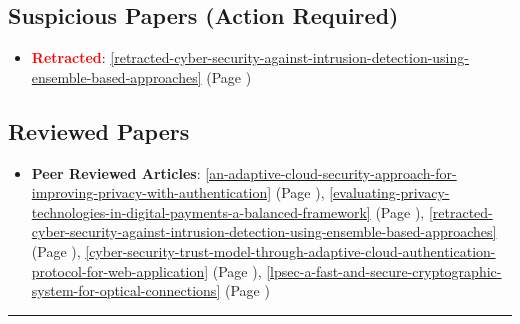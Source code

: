 \documentclass{article}
\begin{document}
\subsection*{Suspicious Papers (Action Required)}
\begin{itemize}
  \item \textbf{\textcolor{red}{Retracted}}: \ref{retracted-cyber-security-against-intrusion-detection-using-ensemble-based-approaches} (Page \pageref{retracted-cyber-security-against-intrusion-detection-using-ensemble-based-approaches})
\end{itemize}

\subsection*{Reviewed Papers}
\begin{itemize}
  \item \textbf{Peer Reviewed Articles}: \ref{an-adaptive-cloud-security-approach-for-improving-privacy-with-authentication} (Page \pageref{an-adaptive-cloud-security-approach-for-improving-privacy-with-authentication}), \ref{evaluating-privacy-technologies-in-digital-payments-a-balanced-framework} (Page \pageref{evaluating-privacy-technologies-in-digital-payments-a-balanced-framework}), \ref{retracted-cyber-security-against-intrusion-detection-using-ensemble-based-approaches} (Page \pageref{retracted-cyber-security-against-intrusion-detection-using-ensemble-based-approaches}), \ref{cyber-security-trust-model-through-adaptive-cloud-authentication-protocol-for-web-application} (Page \pageref{cyber-security-trust-model-through-adaptive-cloud-authentication-protocol-for-web-application}), \ref{lpsec-a-fast-and-secure-cryptographic-system-for-optical-connections} (Page \pageref{lpsec-a-fast-and-secure-cryptographic-system-for-optical-connections})
\end{itemize}

\vspace{1cm}\hrule\vspace{1cm}


\newpage
\end{document}
